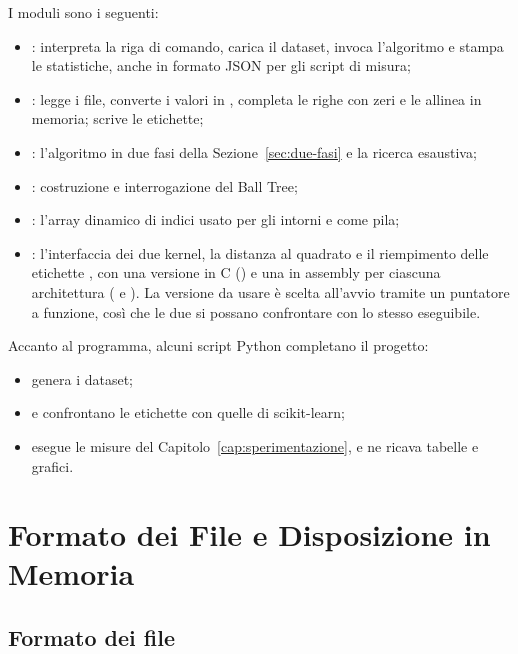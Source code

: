 I moduli sono i seguenti:

\begin{itemize}
    \item {}: interpreta la riga di comando, carica il dataset, invoca l'algoritmo e stampa le statistiche, anche in formato JSON per gli script di misura;
    \item {}: legge i file, converte i valori in , completa le righe con zeri e le allinea in memoria; scrive le etichette;
    \item {}: l'algoritmo in due fasi della Sezione~\ref{sec:due-fasi} e la ricerca esaustiva;
    \item {}: costruzione e interrogazione del Ball Tree;
    \item {}: l'array dinamico di indici usato per gli intorni e come pila;
    \item {}: l'interfaccia dei due kernel, la distanza al quadrato  e il riempimento delle etichette , con una versione in C () e una in assembly per ciascuna architettura ( e ). La versione da usare è scelta all'avvio tramite un puntatore a funzione, così che le due si possano confrontare con lo stesso eseguibile.
\end{itemize}

Accanto al programma, alcuni script Python completano il progetto:
\begin{itemize}
    \item {} genera i dataset;
    \item {} e  confrontano le etichette con quelle di scikit-learn;
    \item {} esegue le misure del Capitolo~\ref{cap:sperimentazione}, e  ne ricava tabelle e grafici.
\end{itemize}

\section{Formato dei File e Disposizione in Memoria}

\subsection*{Formato dei file}

